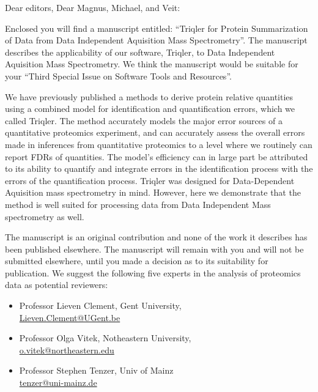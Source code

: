 \documentclass[a4paper]{letter}
\begin{document}
\begin{letter}{}
\vspace*{-5.0cm}

\opening{Dear editors, Dear Magnus, Michael, and Veit:}

Enclosed you will find a manuscript entitled: 
``Triqler for Protein Summarization of Data from Data Independent Aquisition Mass Spectrometry''. 
The manuscript describes the applicability of our software, Triqler, to Data Independent Aquisition Mass Spectrometry. We think the manuscript would be suitable for
your ``Third Special Issue on Software Tools and Resources''. 

We have previously published a methods to derive protein relative quantities 
using a combined model for identification and quantification
errors, which we called Triqler. 
The method accurately models the major error sources of a
quantitative proteomics experiment, and can accurately assess the overall errors
made in inferences from quantitative proteomics to a level where we routinely
can report FDRs of quantities. The model's efficiency can in large part be
attributed to its ability to quantify and integrate errors in the identification
process with the errors of the quantification process.
Triqler was designed for Data-Dependent Aquisition mass spectrometry in mind. 
However, here we demonstrate that the method is well suited for processing data from Data Independent Mass spectrometry as well. 
 
The manuscript is an original contribution and none of the work it
describes has been published elsewhere. The manuscript will
remain with you and will not be submitted elsewhere, until you made a
decision as to its suitability for publication.
We suggest the following five experts in the analysis of proteomics
data as potential reviewers:

\begin{itemize}

\item Professor Lieven Clement, Gent University, \\
\url{Lieven.Clement@UGent.be}

\item Professor Olga Vitek, Notheastern University, \\
\url{o.vitek@northeastern.edu}

\item Professor Stephen Tenzer, Univ of Mainz\\
\url{tenzer@uni-mainz.de}


\end{itemize}
\end{letter}
\end{document}
